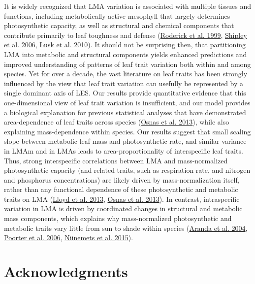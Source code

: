 \documentclass[
  12pt,
  a4paper,
,tablecaptionabove
]{scrartcl}
\begin{document}
It is widely recognized that LMA variation is associated with multiple
tissues and functions, including metabolically active mesophyll that
largely determines photosynthetic capacity, as well as structural and
chemical components that contribute primarily to leaf toughness and
defense (\protect\hyperlink{ref-Roderick1999}{Roderick et al. 1999},
\protect\hyperlink{ref-Shipley2006}{Shipley et al. 2006},
\protect\hyperlink{ref-Lusk2010}{Lusk et al. 2010}). It should not be
surprising then, that partitioning LMA into metabolic and structural
components yields enhanced predictions and improved understanding of
patterns of leaf trait variation both within and among species. Yet for
over a decade, the vast literature on leaf traits has been strongly
influenced by the view that leaf trait variation can usefully be
represented by a single dominant axis of LES. Our results provide
quantitative evidence that this one-dimensional view of leaf trait
variation is insufficient, and our model provides a biological
explanation for previous statistical analyses that have demonstrated
area-dependence of leaf traits across species
(\protect\hyperlink{ref-Osnas2013}{Osnas et al. 2013}), while also
explaining mass-dependence within species. Our results suggest that
small scaling slope between metabolic leaf mass and photosynthetic rate,
and similar variance in LMAm and in LMAs leads to area-proportionality
of interspecific leaf traits. Thus, strong interspecific correlations
between LMA and mass-normalized photosynthetic capacity (and related
traits, such as respiration rate, and nitrogen and phosphorus
concentrations) are likely driven by mass-normalization itself, rather
than any functional dependence of these photosynthetic and metabolic
traits on LMA (\protect\hyperlink{ref-Lloyd2013}{Lloyd et al. 2013},
\protect\hyperlink{ref-Osnas2013}{Osnas et al. 2013}). In contrast,
intraspecific variation in LMA is driven by coordinated changes in
structural and metabolic mass components, which explains why
mass-normalized photosynthetic and metabolic traits vary little from sun
to shade within species (\protect\hyperlink{ref-Aranda2004}{Aranda et
al. 2004}, \protect\hyperlink{ref-Poorter2006b}{Poorter et al. 2006},
\protect\hyperlink{ref-Niinemets2015}{Niinemets et al. 2015}).

\hypertarget{acknowledgments}{%
\section{Acknowledgments}\label{acknowledgments}}
\end{document}
